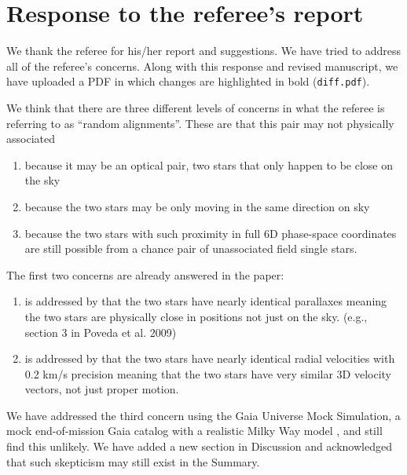 \documentclass[12pt]{article}
\begin{document}
\section*{Response to the referee's report}
\label{response-to-the-referees-report}

We thank the referee for his/her report and suggestions. 
We have tried to address all of the referee's concerns.
Along with this response and revised manuscript, we have uploaded a PDF in which
changes are highlighted in bold ({\tt diff.pdf}).

We think that there are three different levels of concerns
in what the referee is referring to as ``random alignments''.
These are that this pair may not physically associated

\begin{enumerate}
\def\labelenumi{\arabic{enumi}.}
\itemsep1pt\parskip0pt
\item
  because it may be an optical pair, two stars that only happen to be
  close on the sky
\item
  because the two stars may be only moving in the same direction on sky
\item
  because the two stars with such proximity in full 6D phase-space
  coordinates are still possible from a chance pair of unassociated
  field single stars.
\end{enumerate}

The first two concerns are already answered in the paper:

\begin{enumerate}
\def\labelenumi{\arabic{enumi}.}
\itemsep1pt\parskip0pt
\item
  is addressed by that the two stars have nearly identical parallaxes
  meaning the two stars are physically close in positions not just on the
  sky. (e.g., section 3 in Poveda et al. 2009)
\item
  is addressed by that the two stars have nearly identical radial
  velocities with 0.2 km/s precision meaning that the two stars have
  very similar 3D velocity vectors, not just proper motion.
\end{enumerate}

We have addressed the third concern using the Gaia
Universe Mock Simulation, a mock end-of-mission Gaia catalog with a realistic
Milky Way model \citep{gums}, and still find this unlikely. We have added a new
section in Discussion and acknowledged that such skepticism may still exist in
the Summary.
\end{document}
